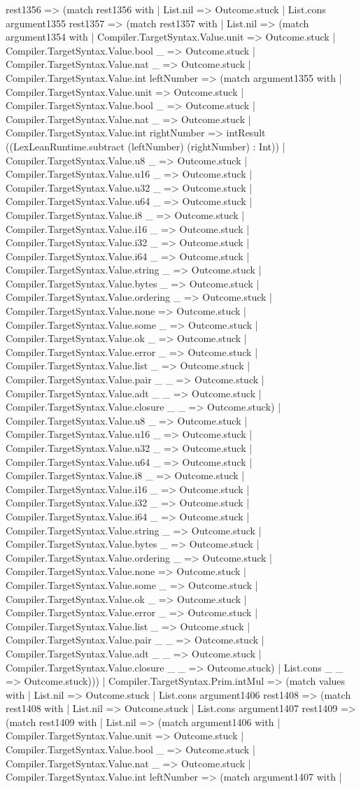 \documentclass[11pt]{article}
\begin{document}
rest1356 => (match rest1356 with | List.nil => Outcome.stuck | List.cons argument1355 rest1357 => (match rest1357 with | List.nil => (match argument1354 with | Compiler.TargetSyntax.Value.unit => Outcome.stuck | Compiler.TargetSyntax.Value.bool \_ => Outcome.stuck | Compiler.TargetSyntax.Value.nat \_ => Outcome.stuck | Compiler.TargetSyntax.Value.int leftNumber => (match argument1355 with | Compiler.TargetSyntax.Value.unit => Outcome.stuck | Compiler.TargetSyntax.Value.bool \_ => Outcome.stuck | Compiler.TargetSyntax.Value.nat \_ => Outcome.stuck | Compiler.TargetSyntax.Value.int rightNumber => intResult ((LexLeanRuntime.subtract (leftNumber) (rightNumber) : Int)) | Compiler.TargetSyntax.Value.u8 \_ => Outcome.stuck | Compiler.TargetSyntax.Value.u16 \_ => Outcome.stuck | Compiler.TargetSyntax.Value.u32 \_ => Outcome.stuck | Compiler.TargetSyntax.Value.u64 \_ => Outcome.stuck | Compiler.TargetSyntax.Value.i8 \_ => Outcome.stuck | Compiler.TargetSyntax.Value.i16 \_ => Outcome.stuck | Compiler.TargetSyntax.Value.i32 \_ => Outcome.stuck | Compiler.TargetSyntax.Value.i64 \_ => Outcome.stuck | Compiler.TargetSyntax.Value.string \_ => Outcome.stuck | Compiler.TargetSyntax.Value.bytes \_ => Outcome.stuck | Compiler.TargetSyntax.Value.ordering \_ => Outcome.stuck | Compiler.TargetSyntax.Value.none => Outcome.stuck | Compiler.TargetSyntax.Value.some \_ => Outcome.stuck | Compiler.TargetSyntax.Value.ok \_ => Outcome.stuck | Compiler.TargetSyntax.Value.error \_ => Outcome.stuck | Compiler.TargetSyntax.Value.list \_ => Outcome.stuck | Compiler.TargetSyntax.Value.pair \_ \_ => Outcome.stuck | Compiler.TargetSyntax.Value.adt \_ \_ => Outcome.stuck | Compiler.TargetSyntax.Value.closure \_ \_ => Outcome.stuck) | Compiler.TargetSyntax.Value.u8 \_ => Outcome.stuck | Compiler.TargetSyntax.Value.u16 \_ => Outcome.stuck | Compiler.TargetSyntax.Value.u32 \_ => Outcome.stuck | Compiler.TargetSyntax.Value.u64 \_ => Outcome.stuck | Compiler.TargetSyntax.Value.i8 \_ => Outcome.stuck | Compiler.TargetSyntax.Value.i16 \_ => Outcome.stuck | Compiler.TargetSyntax.Value.i32 \_ => Outcome.stuck | Compiler.TargetSyntax.Value.i64 \_ => Outcome.stuck | Compiler.TargetSyntax.Value.string \_ => Outcome.stuck | Compiler.TargetSyntax.Value.bytes \_ => Outcome.stuck | Compiler.TargetSyntax.Value.ordering \_ => Outcome.stuck | Compiler.TargetSyntax.Value.none => Outcome.stuck | Compiler.TargetSyntax.Value.some \_ => Outcome.stuck | Compiler.TargetSyntax.Value.ok \_ => Outcome.stuck | Compiler.TargetSyntax.Value.error \_ => Outcome.stuck | Compiler.TargetSyntax.Value.list \_ => Outcome.stuck | Compiler.TargetSyntax.Value.pair \_ \_ => Outcome.stuck | Compiler.TargetSyntax.Value.adt \_ \_ => Outcome.stuck | Compiler.TargetSyntax.Value.closure \_ \_ => Outcome.stuck) | List.cons \_ \_ => Outcome.stuck))) | Compiler.TargetSyntax.Prim.intMul => (match values with | List.nil => Outcome.stuck | List.cons argument1406 rest1408 => (match rest1408 with | List.nil => Outcome.stuck | List.cons argument1407 rest1409 => (match rest1409 with | List.nil => (match argument1406 with | Compiler.TargetSyntax.Value.unit => Outcome.stuck | Compiler.TargetSyntax.Value.bool \_ => Outcome.stuck | Compiler.TargetSyntax.Value.nat \_ => Outcome.stuck | Compiler.TargetSyntax.Value.int leftNumber => (match argument1407 with | 
\end{document}
